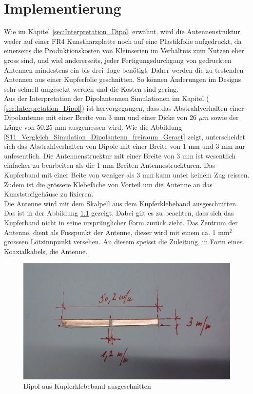 \newpage 
\thispagestyle{empty}
\chapter{Implementierung}\label{sec:Implementierung}
Wie im Kapitel \ref{sec:Interpretation_Dipol} erwähnt, wird die Antennenstruktur weder auf einer FR4 Kunstharzplatte noch auf eine Plastikfolie aufgedruckt, da einerseits die Produktionskosten von Kleinserien im Verhältnis zum Nutzen eher gross sind, und wiel andererseits, jeder Fertigungsdurchgang von gedruckten Antennen mindestens ein bis drei Tage benötigt. Daher werden die zu testenden Antennen aus einer Kupferfolie geschnitten. So können Änderungen im Designs sehr schnell umgesetzt werden und die Kosten sind gering.\\

Aus der Interpretation der Dipolantennen Simulationen im Kapitel ( \ref{sec:Interpretation_Dipol}) ist hervorgegangen, dass das Abstrahlverhalten einer Dipolantenne mit einer Breite von 3 mm und einer Dicke von 26 $\mu m$ sowie der Länge von 50.25 mm ausgemessen wird. Wie die Abbildung \ref{S11_Vergleich_Simulation_Dipolantenn_freiraum_Geraet} zeigt, unterscheidet sich das Abstrahlverhalten von Dipole mit einer Breite von 1 mm und 3 mm nur unfesentlich. Die Antennenstrucktur mit einer Breite von 3 mm ist wesentlich einfacher zu bearbeiten als die 1 mm Breiten Antennestruckturen. Das Kupferband mit einer Beite von weniger als 3 mm kann unter keinem Zug reissen. Zudem ist die grössere Klebefäche von Vorteil um die Antenne an das Kunststoffgehäuse zu fixieren.  \\
\newpage
Die Antenne wird mit dem Skalpell aus dem Kupferklebeband ausgeschnitten. Das ist in der Abbildung \ref{fig:DipolausKupferband} gezeigt. Dabei gilt es zu beachten, dass sich das Kupferband nicht in seine ursprünglicher Form zurück zieht. Das Zentrum der Antenne, dient als Fusspunkt der Antenne, dieser wird mit einem ca. 1 mm$^{2}$ grosssen Lötzinnpunkt versehen. An diesem speisst die Zuleitung, in Form eines Koaxialkabels, die Antenne.\\
\begin{figure}[!ht]
	\centering
	\includegraphics[width=13cm]{content/bilder/Implementierung/Dipol3mm50mm.jpg}%
	\caption{Dipol aus Kupferklebeband ausgeschnitten}
	\label{fig:DipolausKupferband}
\end{figure}

